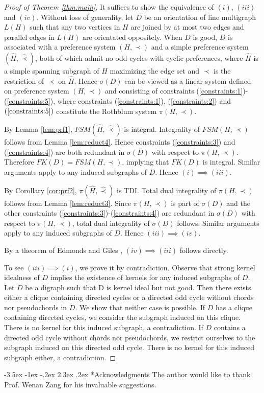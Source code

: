 \documentclass[11pt]{article}
\makeatletter
\numberwithin{theorem}{section}
\renewcommand\section{%
  \@startsection{section}{1}
                {\z@}%
                {-3.5ex \@plus -1ex \@minus -.2ex}%
                {2.3ex \@plus.2ex}%
                {\large\bfseries}%
}
\makeatother
\begin{document}
\begin{proof}[Proof of Theorem \ref{thm:main}]
It suffices to show the equivalence of $(i)$, $(iii)$ and $(iv)$. Without loss of generality, let $D$ be an orientation of line multigraph $L(H)$ such that any two vertices in $H$ are joined by at most two edges and parallel edges in $L(H)$ are orientated oppositely. When $D$ is good, $D$ is associated with a preference system $(H,\prec)$ and a simple preference system $(\hat{H},\hat\prec)$, both of which admit no odd cycles with cyclic preferences, where $\hat{H}$ is a simple spanning subgraph of $H$ maximizing the edge set and $\hat\prec$ is the restriction of $\prec$ on $\hat{H}$.
Hence $\sigma(D)$ can be viewed as a linear system defined on preference system $(H,\prec)$ and consisting of constraints (\ref{constraints:1})-(\ref{constraints:5}), where constraints (\ref{constraints:1}), (\ref{constraints:2}) and $(\ref{constraints:5})$ constitute the Rothblum system $\pi(H,\prec)$.

By Lemma \ref{lem:prf1}, $FSM(\hat{H},\hat\prec)$ is integral. Integrality of $FSM(H,\prec)$ follows from Lemma \ref{lem:reduct4}. Hence constraints (\ref{constraints:3}) and (\ref{constraints:4}) are both redundant in $\sigma(D)$ with respect to $\pi(H,\prec)$. Therefore $FK(D)=FSM(H,\prec)$, implying that $FK(D)$ is integral. Similar arguments apply to any induced subgraphs of $D$. Hence $(i)\implies (iii)$. 

By Corollary \ref{cor:prf2}, $\pi(\hat{H},\hat\prec)$ is TDI. Total dual integrality of $\pi(H,\prec)$ follows from Lemma \ref{lem:reduct3}. Since $\pi(H,\prec)$ is part of $\sigma(D)$ and the other constraints (\ref{constraints:3})-(\ref{constraints:4}) are redundant in $\sigma(D)$ with respect to $\pi(H,\prec)$, total dual integrality of $\sigma(D)$ follows. Similar arguments apply to any induced subgraphs of $D$. Hence $(iii)\implies (iv)$.

By a theorem of Edmonds and Giles \cite{EdmoGile77}, $(iv)\implies (iii)$ follows directly.

To see $(iii)\implies (i)$, we prove it by contradiction. Observe that strong kernel idealness of  $D$ implies the existence of kernels for any induced subgraphs of $D$. Let $D$ be a digraph such that D is kernel ideal but not good. Then there exists either a clique containing directed cycles or a directed odd cycle without chords nor pseudochords in $D$. We show that neither case is possible. If $D$ has a clique containing directed cycles, we consider the subgraph induced on this clique. There is no kernel for this induced subgraph, a contradiction. If $D$ contains a directed odd cycle without chords nor pseudochords, we restrict ourselves to the subgraph induced on this directed odd cycle. There is no kernel for this induced subgraph either, a contradiction.
\end{proof}

\section*{Acknowledgments}
The author would like to thank Prof. Wenan Zang for his invaluable suggestions.



\nocite{Schr86}
\end{document}
